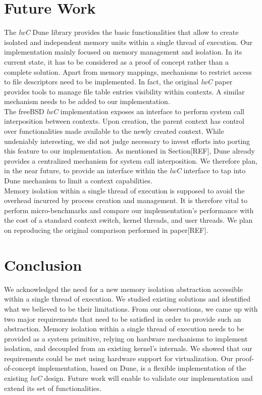 \documentclass[letterpaper,twocolumn,10pt]{article}
\begin{document}
\section{Future Work}
The \emph{lwC} Dune library provides the basic functionalities that allow to create isolated and independent memory units within a single thread of execution.
Our implementation mainly focused on memory management and isolation.
In its current state, it has to be considered as a proof of concept rather than a complete solution.
Apart from memory mappings, mechanisms to restrict access to file descriptors need to be implemented.
In fact, the original \emph{lwC} paper provides tools to manage file table entries visibility within contexts.
A similar mechanism needs to be added to our implementation.\\

The freeBSD \emph{lwC} implementation exposes an interface to perform system call interposition between contexts.
Upon creation, the parent context has control over functionalities made available to the newly created context.
While undeniably interesting, we did not judge necessary to invest efforts into porting this feature to our implementation.
As mentioned in Section[REF], Dune already provides a centralized mechanism for system call interposition.
We therefore plan, in the near future, to provide an interface within the \emph{lwC} interface to tap into Dune mechanism to limit a context capabilities.\\

Memory isolation within a single thread of execution is supposed to avoid the overhead incurred by process creation and management.
It is therefore vital to perform micro-benchmarks and compare our implementation's performance with the cost of a standard context switch, kernel threads, and user threads.
We plan on reproducing the original comparison performed in paper[REF].

\section{Conclusion}
We acknowledged the need for a new memory isolation abstraction accessible within a single thread of execution.
We studied existing solutions and identified what we believed to be their limitations.
From our observations, we came up with two major requirements that need to be satisfied in order to provide such an abstraction.
Memory isolation within a single thread of execution needs to be provided as a system primitive, relying on hardware mechanisms to implement isolation, and decoupled from an existing kernel's internals.
We showed that our requirements could be met using hardware support for virtualization.
Our proof-of-concept implementation, based on Dune, is a flexible implementation of the existing \emph{lwC} design.
Future work will enable to validate our implementation and extend its set of functionalities. 
\end{document}
